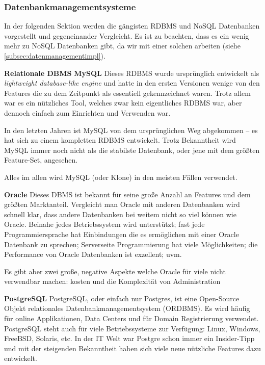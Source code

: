 \subsubsection{Datenbankmanagementsysteme}
\label{subsec:dbms}

In der folgenden Sektion werden die gängisten RDBMS und NoSQL Datenbanken vorgestellt und gegeneinander Vergleicht. Es ist zu beachten, dass es ein wenig mehr zu NoSQL Datenbanken gibt, da wir mit einer solchen arbeiten (siehe \ref{subsec:datenmanagementimpl}).

\textbf{Relationale DBMS\newline}
\textbf{MySQL\newline}
Dieses RDBMS wurde ursprünglich entwickelt als \textit{lightweight database-like engine} und hatte in den ersten Versionen wenige von den Features die zu dem Zeitpunkt als essentiell gekennzeichnet waren. Trotz allem war es ein nützliches Tool, welches zwar kein eigentliches RDBMS war, aber dennoch einfach zum Einrichten und Verwenden war.

In den letzten Jahren ist MySQL von dem ursprünglichen Weg abgekommen – es hat sich zu einem kompletten RDBMS entwickelt.  Trotz Bekanntheit wird MySQL immer noch nicht als die stabilste Datenbank, oder jene mit dem größten Feature-Set, angesehen.

Alles im allen wird MySQL (oder Klone) in den meisten Fällen verwendet.

\textbf{Oracle\newline}
Dieses DBMS ist bekannt für seine große Anzahl an Features und dem größten Marktanteil. Vergleicht man Oracle mit anderen Datenbanken wird schnell klar, dass andere Datenbanken bei weitem nicht so viel können wie Oracle. Beinahe jedes Betriebssystem wird unterstützt; fast jede Programmiersprache hat Einbindungen die es ermöglichen mit einer Oracle Datenbank zu sprechen; Serverseite Programmierung hat viele Möglichkeiten; die Performance von Oracle Datenbanken ist exzellent; uvm.

Es gibt aber zwei große, negative Aspekte welche Oracle für viele nicht verwendbar machen: kosten und die Komplexität von Administration

\textbf{PostgreSQL\newline}
PostgreSQL, oder einfach nur Postgres, ist eine Open-Source Objekt relationales Datenbankmanagementsystem (ORDBMS). Es wird häufig für online Applikationen, Data Centers und für Domain Registrierung verwendet. PostgreSQL steht auch für viele Betriebssysteme zur Verfügung: Linux, Windows, FreeBSD, Solaris, etc. In der IT Welt war Postgre schon immer ein Insider-Tipp und mit der steigenden Bekanntheit haben sich viele neue nützliche Features dazu entwickelt. 

